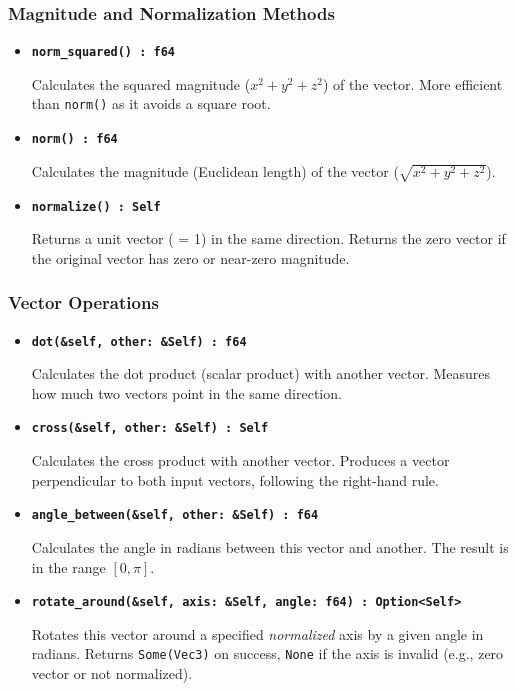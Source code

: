 \documentclass[12pt,a4paper]{article}
\begin{document}
\subsubsection{Magnitude and Normalization Methods}
\begin{itemize}
    \item \textbf{\texttt{norm\_squared() : f64}}
    
    Calculates the squared magnitude (\(x^2 + y^2 + z^2\)) of the vector. More efficient than \texttt{norm()} as it avoids a square root.

    \item \textbf{\texttt{norm() : f64}}

    Calculates the magnitude (Euclidean length) of the vector (\(\sqrt{x^2 + y^2 + z^2}\)).

    \item \textbf{\texttt{normalize() : Self}}
    
    Returns a unit vector ( = 1) in the same direction. Returns the zero vector if the original vector has zero or near-zero magnitude.
\end{itemize}

\subsubsection{Vector Operations}
\begin{itemize}
    \item \textbf{\texttt{dot(\&self, other: \&Self) : f64}}

    Calculates the dot product (scalar product) with another vector. Measures how much two vectors point in the same direction.

    \item \textbf{\texttt{cross(\&self, other: \&Self) : Self}}
    
    Calculates the cross product with another vector. Produces a vector perpendicular to both input vectors, following the right-hand rule.

    \item \textbf{\texttt{angle\_between(\&self, other: \&Self) : f64}}
    
    Calculates the angle in radians between this vector and another. The result is in the range \([0, \pi]\).

    \item \textbf{\texttt{rotate\_around(\&self, axis: \&Self, angle: f64) : Option<Self>}}
    
    Rotates this vector around a specified \emph{normalized} axis by a given angle in radians. Returns \texttt{Some(Vec3)} on success, \texttt{None} if the axis is invalid (e.g., zero vector or not normalized).
\end{itemize}
\end{document}
